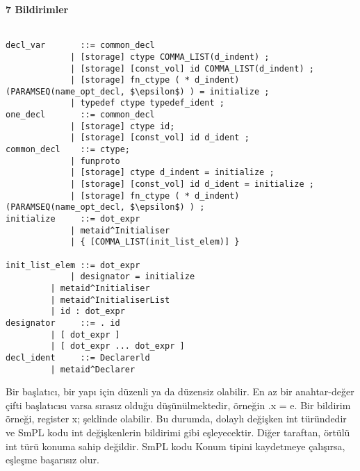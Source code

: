 \documentclass[a4paper,22pt, right=5cm]{article}
\begin{document}
\textbf{7 Bildirimler}\\
\\
\begin{lstlisting}[mathescape]
decl_var       ::= common_decl
	         | [storage] ctype COMMA_LIST(d_indent) ;
	         | [storage] [const_vol] id COMMA_LIST(d_indent) ;
	         | [storage] fn_ctype ( * d_indent) (PARAMSEQ(name_opt_decl, $\epsilon$) ) = initialize ;
	         | typedef ctype typedef_ident ;
one_decl       ::= common_decl
	         | [storage] ctype id;
	         | [storage] [const_vol] id d_ident ;
common_decl    ::= ctype;
	         | funproto
	         | [storage] ctype d_indent = initialize ;
	         | [storage] [const_vol] id d_ident = initialize ;
	         | [storage] fn_ctype ( * d_indent) (PARAMSEQ(name_opt_decl, $\epsilon$) ) ;
initialize     ::= dot_expr
	         | metaid^Initialiser
	         | { [COMMA_LIST(init_list_elem)] }

init_list_elem ::= dot_expr
	         | designator = initialize
		 | metaid^Initialiser
		 | metaid^InitialiserList
		 | id : dot_expr
designator     ::= . id
		 | [ dot_expr ]
		 | [ dot_expr ... dot_expr ]
decl_ident     ::= Declarerld
		 | metaid^Declarer
\end{lstlisting}
Bir başlatıcı, bir yapı için düzenli ya da düzensiz olabilir. En az bir anahtar-değer çifti başlatıcısı varsa sırasız olduğu düşünülmektedir, örneğin .x = e.
Bir bildirim örneği, register x; şeklinde olabilir. Bu durumda, dolaylı değişken int türündedir ve SmPL kodu int değişkenlerin bildirimi gibi eşleyecektir. Diğer taraftan, örtülü int türü konuma sahip değildir. SmPL kodu Konum tipini kaydetmeye çalışırsa, eşleşme başarısız olur.
\end{document}
